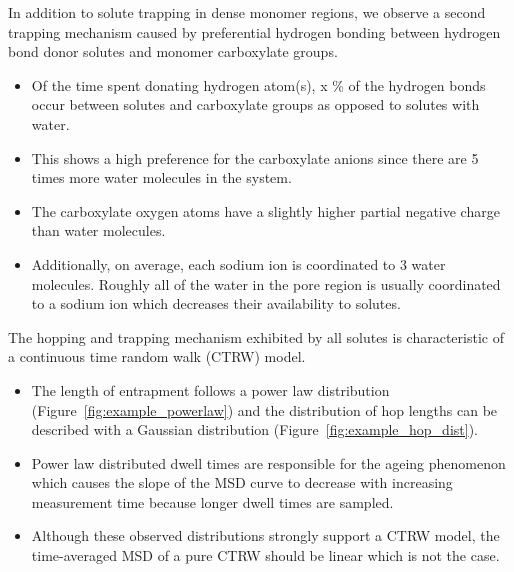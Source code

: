 \documentclass{article}
\begin{document}
  In addition to solute trapping in dense monomer regions, we observe a second
  trapping mechanism caused by preferential hydrogen bonding between 
  hydrogen bond donor solutes and monomer carboxylate groups. 
  \begin{itemize}
    \item Of the time spent donating hydrogen atom(s), x \% of the hydrogen
    bonds occur between solutes and carboxylate groups as opposed to solutes
    with water. 
    \item This shows a high preference for the carboxylate anions since there
    are 5 times more water molecules in the system.
    \item The carboxylate oxygen atoms have a slightly higher partial negative
    charge than water molecules.
    \item Additionally, on average, each sodium ion is coordinated to 3 water
    molecules. Roughly all of the water in the pore region is usually coordinated
    to a sodium ion which decreases their availability to solutes.
  \end{itemize}
  	
  \noindent The hopping and trapping mechanism exhibited by all solutes is characteristic of
  a continuous time random walk (CTRW) model.	
  \begin{itemize}
  	\item The length of entrapment follows a power law distribution 
  	(Figure~\ref{fig:example_powerlaw}) and the distribution of hop lengths can be 
  	described with a Gaussian distribution (Figure~\ref{fig:example_hop_dist}).
  	\item Power law distributed dwell times are responsible for the ageing phenomenon
  	which causes the slope of the MSD curve to decrease with increasing measurement
  	time because longer dwell times are sampled.  %
 	\item Although these observed distributions strongly support a CTRW model, the time-averaged
 	MSD of a pure CTRW should be linear which is not the case.~\cite{neusius_subdiffusion_2008,meroz_subdiffusion_2010}
  \end{itemize}
  
\end{document}
